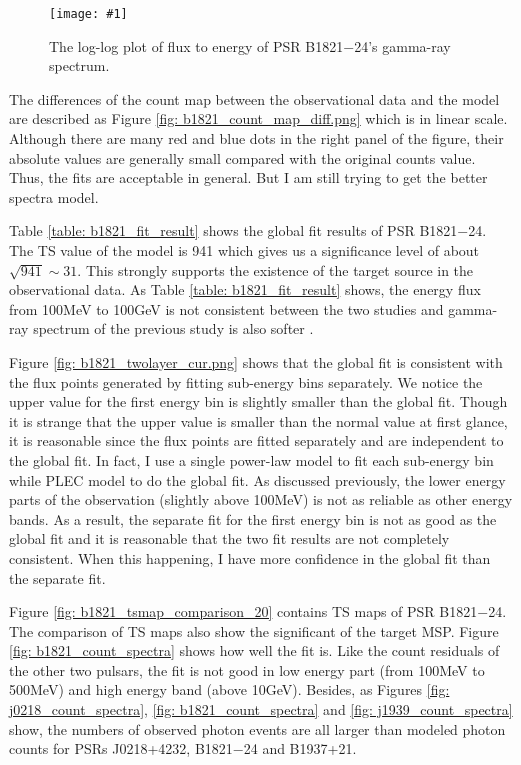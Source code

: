 \documentclass[a4paper, 12pt]{report}
\newcommand{\singleFig}[3]{
  \begin{figure}[!htp]
    \centering
    \texttt{[image: \#1]}
    \caption{#3}
    \label{fig: #1}
  \end{figure}
}
\begin{document}
      \singleFig{b1821_cur.png}{0.37}{The log-log plot of flux to energy of 
        PSR B1821$-$24's gamma-ray spectrum. }
      \vspace{1cm}

      The differences of the count map between the observational data and the model are described 
      as Figure \ref{fig: b1821_count_map_diff.png} which is in linear scale. Although there are 
      many red and blue dots in the right panel of the figure, their absolute values are 
      generally small compared with the original counts value.
      Thus, the fits are acceptable in general. But I am still trying to get the better spectra 
      model. 

      Table \ref{table: b1821_fit_result} shows the global fit results of PSR B1821$-$24. 
      The TS value of the model is 941 which gives us a significance level 
      of about $\sqrt{941} \sim 31$. This strongly supports the existence of the target source in 
      the observational data. As Table \ref{table: b1821_fit_result} shows, the energy flux from 
      100MeV to 100GeV is not consistent between the two studies and gamma-ray spectrum of the 
      previous study is also softer \cite{2013ApJ...778..106J}.

      Figure \ref{fig: b1821_twolayer_cur.png} shows that the global fit is consistent with 
      the flux points generated by fitting sub-energy bins separately. We notice the upper value 
      for the first energy bin is slightly smaller than the global fit. 
      Though it is strange that the upper value is smaller than the normal value at first glance, 
      it is reasonable since the flux points are fitted separately and are independent to 
      the global fit. In fact, I use a single power-law model to fit each sub-energy bin while 
      PLEC model to do the global fit. As discussed previously, the lower energy parts of 
      the observation (slightly above 100MeV) is not as reliable as other energy bands. As a result, the 
      separate fit for the first energy bin is not as good as the global fit and it is reasonable 
      that the two fit results are not completely consistent. When this happening, I have 
      more confidence in the global fit than the separate fit.
            
      Figure \ref{fig: b1821_tsmap_comparison_20} contains TS maps of PSR B1821$-$24. The 
      comparison of TS maps also show the significant of the target MSP. Figure 
      \ref{fig: b1821_count_spectra} shows how well the fit is. Like the count residuals of 
      the other two pulsars, the fit is not good in low energy part (from 100MeV to 500MeV)
      and high energy band (above 10GeV). Besides, as Figures \ref{fig: j0218_count_spectra},
      \ref{fig: b1821_count_spectra} and \ref{fig: j1939_count_spectra} show, the numbers of 
      observed photon events are all larger than modeled photon counts for PSRs J0218+4232, 
      B1821$-$24 and B1937+21. 
\end{document}
